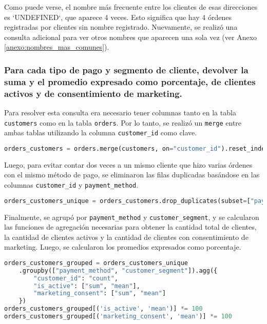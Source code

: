 Como puede verse, el nombre más frecuente entre los clientes de esas direcciones es `UNDEFINED`, que aparece 4 veces. Esto significa que hay 4 órdenes registradas por clientes sin nombre registrado. Nuevamente, se realizó una consulta adicional para ver otros nombres que aparecen una sola vez (ver Anexo \ref{anexo:nombres_mas_comunes}).

\subsubsection{Para cada tipo de pago y segmento de cliente, devolver la suma y el promedio expresado como porcentaje, de clientes activos y de consentimiento de marketing.}

Para resolver esta consulta era necesario tener columnas tanto en la tabla \texttt{customers} como en la tabla \texttt{orders}. Por lo tanto, se realizó un \texttt{merge} entre ambas tablas utilizando la columna \texttt{customer\_id} como clave.

\begin{lstlisting}[language=Python, xleftmargin=78pt, xrightmargin=78pt]
orders_customers = orders.merge(customers, on="customer_id").reset_index()
\end{lstlisting}

Luego, para evitar contar dos veces a un mismo cliente que hizo varias órdenes con el mismo método de pago, se eliminaron las filas duplicadas basándose en las columnas \texttt{customer\_id} y \texttt{payment\_method}. 

\begin{lstlisting}[language=Python, xleftmargin=23pt, xrightmargin=23pt]
orders_customers_unique = orders_customers.drop_duplicates(subset=["payment_method", "customer_id"])
\end{lstlisting}

Finalmente, se agrupó por \texttt{payment\_method} y \texttt{customer\_segment}, y se calcularon las funciones de agregación necesarias para obtener la cantidad total de clientes, la cantidad de clientes activos y la cantidad de clientes con consentimiento de marketing. Luego, se calcularon los promedios expresados como porcentaje.

\begin{lstlisting}[language=Python, xleftmargin=100pt, xrightmargin=100pt]
orders_customers_grouped = orders_customers_unique
    .groupby(["payment_method", "customer_segment"]).agg({
        "customer_id": "count",
        "is_active": ["sum", "mean"],
        "marketing_consent": ["sum", "mean"]
    })
orders_customers_grouped[('is_active', 'mean')] *= 100
orders_customers_grouped[('marketing_consent', 'mean')] *= 100
\end{lstlisting}

